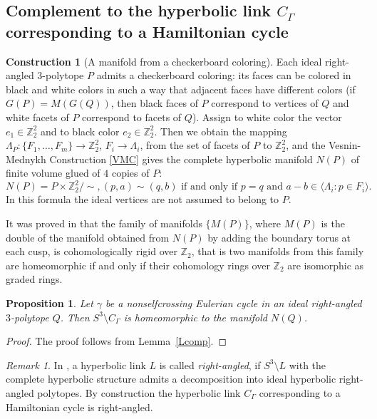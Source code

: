 \documentclass[12pt]{amsart}
\newtheorem{proposition}[formula]{Proposition}
\theoremstyle{definition}
\newtheorem{construction}[formula]{Construction}
\theoremstyle{remark}
\newtheorem{remark}[formula]{Remark}
\begin{document}
\subsection{Complement to the hyperbolic link $C_\Gamma$ corresponding to a Hamiltonian cycle}
\begin{construction}[A manifold from a checkerboard coloring]
Each ideal right-angled $3$-polytope $P$ admits a checkerboard coloring: its faces can be colored in 
black and white colors in such a way that adjacent faces have different colors (if $G(P)=M(G(Q))$, then 
black faces of $P$ correspond to vertices of $Q$ and white facets of $P$ correspond to facets of $Q$). 
Assign to white color the vector $e_1\in\mathbb Z_2^2$
and to black color $e_2\in \mathbb Z_2^2$. Then we obtain the mapping 
$\Lambda_P\colon \{F_1,\dots, F_m\}\to\mathbb Z_2^2$, $F_i\to \Lambda_i$,  from the set of facets of $P$ to $\mathbb Z_2^2$, 
and the Vesnin-Mednykh Construction \ref{VMC} gives the 
complete hyperbolic manifold $N(P)$ of finite volume glued of $4$ copies of $P$:
$$
N(P)=P\times \mathbb Z_2^2/\sim, (p,a)\sim (q,b) \text{ if and only if } p=q\text{ and }a-b\in\langle \Lambda_i\colon p\in F_i\rangle. 
$$  
In this formula the ideal vertices are not assumed to belong to $P$. 
\end{construction} It was proved in \cite{E22b} that the family of manifolds 
$\{M(P)\}$, where $M(P)$ is the double of the manifold obtained from $N(P)$ by adding the boundary torus at each cusp, 
is cohomologically rigid over $\mathbb Z_2$, that is two manifolds from this family are homeomorphic if and only if their 
cohomology rings over $\mathbb Z_2$ are isomorphic as graded rings.

\begin{proposition}
Let $\gamma$ be a nonselfcrossing Eulerian cycle in an ideal right-angled $3$-polytope $Q$.
Then $S^3\setminus C_\Gamma$ is homeomorphic to the manifold $N(Q)$.
\end{proposition}
\begin{proof}
The proof follows from Lemma~\ref{Lcomp}.
\end{proof}
\begin{remark}
In \cite{CKP22}, a hyperbolic link $L$ is called {\it right-angled}, if $S^3\setminus L$ with
the complete hyperbolic structure admits a decomposition into ideal hyperbolic right-angled
polytopes. By construction the hyperbolic link $C_\Gamma$ corresponding to a Hamiltonian cycle is right-angled. 
\end{remark}
\end{document}
